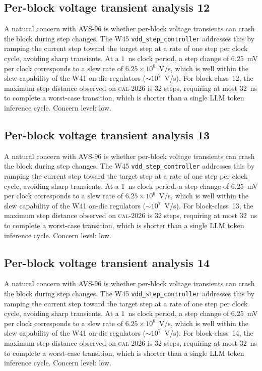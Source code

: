 \subsection{Per-block voltage transient analysis 12}

A natural concern with AVS-96 is whether per-block voltage transients
can crash the block during step changes. The W45 \texttt{vdd\_step\_controller} addresses this by ramping the current
step toward the target step at a rate of one step per clock cycle,
avoiding sharp transients. At a $1$~ns clock period, a step change of
$6.25$~mV per clock corresponds to a slew rate of $6.25\times 10^6$~V/s,
which is well within the slew capability of the W41 on-die regulators
($\sim 10^7$~V/s). For block-class~12, the maximum step distance
observed on \textsc{cal-2026} is $32$ steps, requiring at most $32$~ns
to complete a worst-case transition, which is shorter than a single
LLM token inference cycle. Concern level: low.


\subsection{Per-block voltage transient analysis 13}

A natural concern with AVS-96 is whether per-block voltage transients
can crash the block during step changes. The W45 \texttt{vdd\_step\_controller} addresses this by ramping the current
step toward the target step at a rate of one step per clock cycle,
avoiding sharp transients. At a $1$~ns clock period, a step change of
$6.25$~mV per clock corresponds to a slew rate of $6.25\times 10^6$~V/s,
which is well within the slew capability of the W41 on-die regulators
($\sim 10^7$~V/s). For block-class~13, the maximum step distance
observed on \textsc{cal-2026} is $32$ steps, requiring at most $32$~ns
to complete a worst-case transition, which is shorter than a single
LLM token inference cycle. Concern level: low.


\subsection{Per-block voltage transient analysis 14}

A natural concern with AVS-96 is whether per-block voltage transients
can crash the block during step changes. The W45 \texttt{vdd\_step\_controller} addresses this by ramping the current
step toward the target step at a rate of one step per clock cycle,
avoiding sharp transients. At a $1$~ns clock period, a step change of
$6.25$~mV per clock corresponds to a slew rate of $6.25\times 10^6$~V/s,
which is well within the slew capability of the W41 on-die regulators
($\sim 10^7$~V/s). For block-class~14, the maximum step distance
observed on \textsc{cal-2026} is $32$ steps, requiring at most $32$~ns
to complete a worst-case transition, which is shorter than a single
LLM token inference cycle. Concern level: low.


